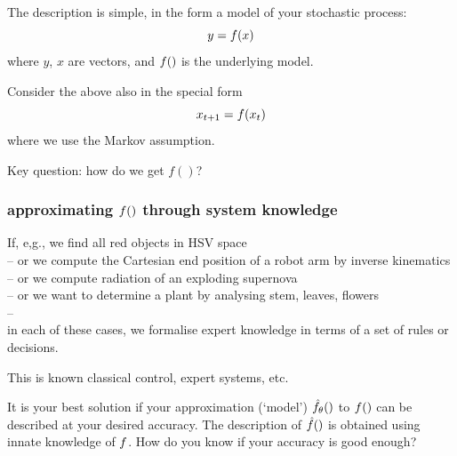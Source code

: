 \documentclass[USenglish,pdftex,compress,10pt,svgnamesi]{beamer}%
\begin{document}
\begin{frame}
The description is simple, in the form a model of your stochastic process:
$$
y = f(x)
$$
where $y$, $x$ are vectors, and $f()$ is the underlying model.

Consider the above also in the special form
$$
x_{t+1} = f (x_t)
$$
where we use the Markov assumption.

Key question: how do we get $f()$?
\end{frame}



\begin{frame}
\frametitle{approximating $f()$ through system knowledge}
If, e,g., we find all red objects in HSV space\\
 -- or we compute the Cartesian end position of a robot arm by inverse kinematics\\
 -- or we compute radiation of an exploding supernova\\
 -- or we want to determine a plant by analysing stem, leaves, flowers\\
 --\\
in each of these cases, we formalise expert knowledge in terms of a set of rules or decisions.

This is known classical control, expert systems, etc.

It is your best solution if your approximation (`model') $\hat{f}_\theta()$ to $f()$ can be described at your desired accuracy.
The description of $\hat{f}()$ is obtained using innate knowledge of $f$.
How do you know if your accuracy is good enough?
\end{frame}
\end{document}
